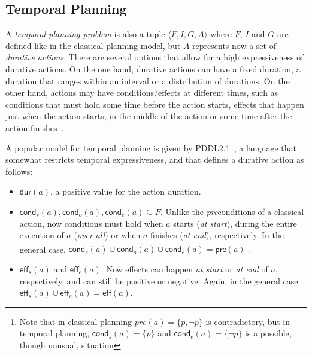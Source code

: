 \documentclass[runningheads]{llncs}
\newcommand{\tup}[1]{{\langle #1 \rangle}}
\newcommand{\pre}{\mathsf{pre}}    %
\newcommand{\eff}{\mathsf{eff}}    %
\newcommand{\cond}{\mathsf{cond}}  %
\newcommand{\dur}{\mathsf{dur}}    %
\begin{document}
\subsection{Temporal Planning}
\label{sec:temporalplanning}

A {\em temporal planning problem} is also a tuple $\tup{F,I,G,A}$ where $F$, $I$ and $G$ are defined like in the classical planning model, but $A$ represents now a set of {\em durative actions}. There are several options that allow for a high expressiveness of durative actions. On the one hand, durative actions can have a fixed duration, a duration that ranges within an interval or a distribution of durations. On the other hand, actions may have conditions/effects at different times, such as conditions that must hold some time before the action starts, effects that happen just when the action starts, in the middle of the action or some time after the action finishes~\cite{garrido2009constraint}.

A popular model for temporal planning is given by PDDL2.1~\cite{fox2003pddl2}, a language that somewhat restricts temporal expressiveness, and that defines a durative action as follows:

\begin{itemize}

\item $\dur(a)$, a positive value for the action duration.

\item $\cond_s(a), \cond_o(a), \cond_e(a) \subseteq F$. Unlike the \emph{pre}conditions of a classical action, now conditions must hold when $a$ starts ({\em at start}), during the entire execution of $a$ ({\em over all}) or when $a$ finishes ({\em at end}), respectively. In the general case, $\cond_s(a) \cup \cond_o(a) \cup \cond_e(a) = \pre(a)$\footnote{Note that in classical planning $pre(a)=\{p,\neg p\}$ is contradictory, but in temporal planning, $\cond_s(a)=\{p\}$ and $\cond_e(a)=\{\neg p\}$ is a possible, though unusual, situation}.


\item $\eff_s(a)$ and $\eff_e(a)$. Now effects can happen {\em at start} or {\em at end} of $a$, respectively, and can still be positive or negative. Again, in the general case $\eff_s(a) \cup \eff_e(a) = \eff(a)$.

\end{itemize}
\end{document}
